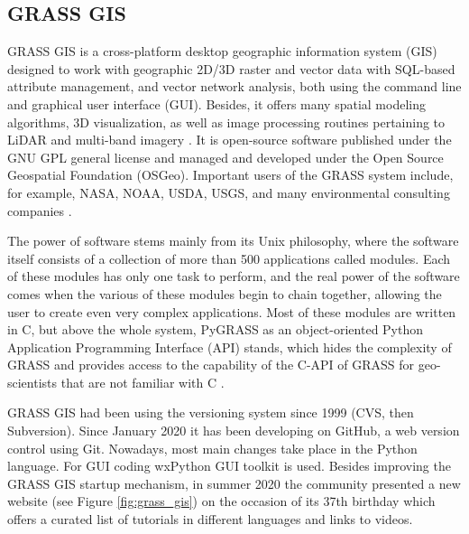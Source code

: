\documentclass[a4paper,10pt,twoside]{article}
\begin{document}
\newpage
\vspace*{-1cm}
\subsection{GRASS GIS}
\label{subsection:grassgis}
\noindent GRASS GIS is a cross-platform desktop geographic information
system (GIS) designed to work with geographic 2D/3D raster and vector
data with SQL-based attribute management, and vector network analysis,
both using the command line and graphical user interface
(GUI). Besides, it offers many spatial modeling algorithms, 3D
visualization, as well as image processing routines pertaining to
LiDAR and multi-band imagery \cite{NETELER2012124}. It is open-source
software published under the GNU GPL general license and managed and
developed under the Open Source Geospatial Foundation
(OSGeo). Important users of the GRASS system include, for example,
NASA, NOAA, USDA, USGS, and many environmental consulting companies
\cite{grassgis}.

The power of software stems mainly from its Unix philosophy, where the
software itself consists of a collection of more than 500 applications
called modules. Each of these modules has only one task to perform,
and the real power of the software comes when the various of these
modules begin to chain together, allowing the user to create even very
complex applications. Most of these modules are written in C, but
above the whole system, PyGRASS as an object-oriented Python
Application Programming Interface (API) stands, which hides the
complexity of GRASS and provides access to the capability of the C-API
of GRASS for geo-scientists that are not familiar with C
\cite{pygrass}.

GRASS GIS had been using the versioning system since 1999 (CVS, then
Subversion). Since January 2020 it has been developing on GitHub, a web
version control using Git. Nowadays, most main changes take place in
the Python language. For GUI coding wxPython GUI toolkit is used.
Besides improving the GRASS GIS startup mechanism,
in summer 2020 the community presented a new website (see Figure
\ref{fig:grass_gis}) on the occasion of its 37th birthday which offers
a curated list of tutorials in different languages and links to
videos.
\end{document}
